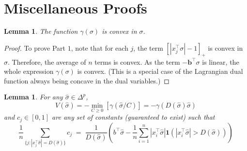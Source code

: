 \documentclass{colt2015} %
\newtheorem{lem}[thm]{Lemma}
\newcommand{\vb}{\mathbf{b}}
\newcommand{\ifn}{\mathbf{1}} %
\newcommand{\abs}[1]{\left| #1 \right|}
\newcommand{\sighat}{\hat{\sigma}}
\newcommand{\lrp}[1]{\left(#1\right)}
\begin{document}


\section{Miscellaneous Proofs}
\label{sec:miscpfs}

\begin{lem}
\label{lem:helperthreshcvx}
The function $\gamma(\sigma)$ is convex in $\sigma$.
\end{lem}
\begin{proof}
To prove Part $1$, note that for each $j$, 
the term $\left[ \abs{x_{j}^\top \sigma} - 1 \right]_{+}$ is convex in $\sigma$. 
Therefore, the average of $n$ terms is convex. 
As the term $- \vb^\top \sigma$ is linear, the whole
expression $\gamma (\sigma)$ is convex.
(This is a special case of the Lagrangian dual function always being concave in the dual variables.)
\end{proof}





\iffalse

\begin{lem}
\label{lem:derivationofD}
For any $\sighat \in \Delta^p$,
$$ V (\sighat) = - \min_{C \geq 0} \left[ \gamma (\sighat / C) \right] = - \gamma ( D(\sighat) \sighat) $$
and $c_j \in [0,1]$ are any set of constants (guaranteed to exist) such that 
$$ \frac{1}{n} \sum_{\{j : \abs{x_{j}^\top \sighat} = D (\sighat) \}} c_j 
\;=\; \frac{1}{D (\sighat)} \lrp{ b^\top \sighat 
- \frac{1}{n} \sum_{i=1}^n \abs{x_{i}^\top \sighat} \ifn \lrp{ \abs{x_{i}^\top \sighat} > D (\sighat)}  } $$
\end{lem}
\end{document}
